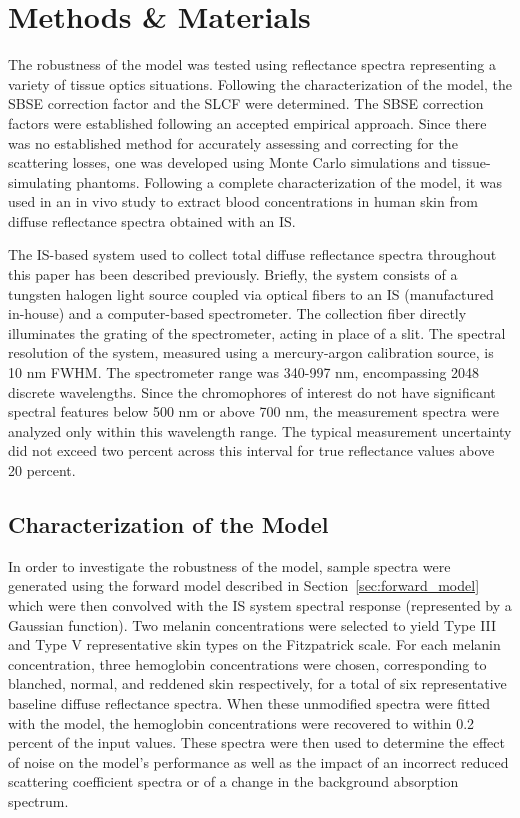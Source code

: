 \section{Methods \& Materials}
The robustness of the model was tested using reflectance spectra representing a variety of tissue optics situations. Following the characterization of the model, the SBSE correction factor and the SLCF were determined. The SBSE correction factors were established following an accepted empirical approach.\cite{Labspherec} Since there was no established method for accurately assessing and correcting for the scattering losses, one was developed using Monte Carlo simulations and tissue-simulating phantoms. Following a complete characterization of the model, it was used in an in vivo study to extract blood concentrations in human skin from diffuse reflectance spectra obtained with an IS.

The IS-based system used to collect total diffuse reflectance spectra throughout this paper has been described previously.\cite{Glennie2014b} Briefly, the system consists of a tungsten halogen light source coupled via optical fibers to an IS (manufactured in-house) and a computer-based spectrometer. The collection fiber directly illuminates the grating of the spectrometer, acting in place of a slit. The spectral resolution of the system, measured using a mercury-argon calibration source, is 10 nm FWHM. The spectrometer range was 340-997 nm, encompassing 2048 discrete wavelengths. Since the chromophores of interest do not have significant spectral features below 500 nm or above 700 nm, the measurement spectra were analyzed only within this wavelength range. The typical measurement uncertainty did not exceed two percent across this interval for true reflectance values above 20 percent.

\subsection{Characterization of the Model}
In order to investigate the robustness of the model, sample spectra were generated using the forward model described in Section~\ref{sec:forward_model} which were then convolved with the IS system spectral response (represented by a Gaussian function). Two melanin concentrations were selected to yield Type III and Type V representative skin types on the Fitzpatrick scale.\cite{Fitzpatrick1988} For each melanin concentration, three hemoglobin concentrations were chosen, corresponding to blanched, normal, and reddened skin respectively, for a total of six representative baseline diffuse reflectance spectra. When these unmodified spectra were fitted with the model, the hemoglobin concentrations were recovered to within 0.2 percent of the input values. These spectra were then used to determine the effect of noise on the model's performance as well as the impact of an incorrect reduced scattering coefficient spectra or of a change in the background absorption spectrum.

